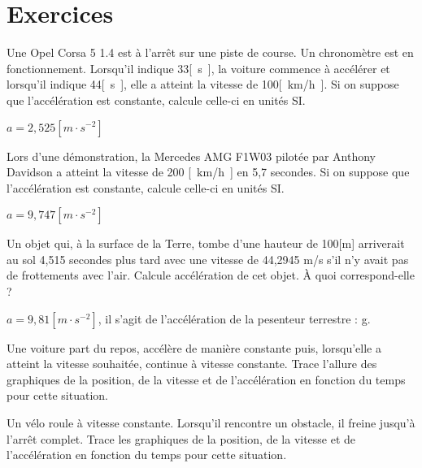 \section{Exercices}
\begin{exercise}
  Une Opel Corsa 5 1.4 est à l'arrêt sur une piste de course. Un chronomètre est en fonctionnement. Lorsqu'il indique 33\unit{[s]}, la voiture commence à accélérer et lorsqu'il indique 44\unit{[s]}, elle a atteint la vitesse de 100\unit{[km/h]}. Si on suppose que l'accélération est constante, calcule celle-ci en unités SI.
\end{exercise}
\begin{solution}
  \(a=2,525\unit{[m \cdot s^{-2}]}\)
\end{solution}
\begin{exercise}
  Lors d'une démonstration, la Mercedes AMG F1W03 pilotée par Anthony Davidson a atteint la vitesse de 200 \unit{[km/h]} en 5,7 secondes. Si on suppose que l'accélération est constante, calcule celle-ci en unités SI.
\end{exercise}
\begin{solution}
  \(a=9,747\unit{[m \cdot s^{-2}]}\)
\end{solution}

\begin{exercise}
  Un objet qui, à la surface de la Terre, tombe d'une hauteur de 100[m] arriverait au sol 4,515 secondes plus tard avec une vitesse de 44,2945 m/s s'il n'y avait pas de frottements avec l'air. Calcule accélération de cet objet. À quoi correspond-elle ?
\end{exercise}
\begin{solution}
  \(a=9,81\unit{[m \cdot s^{-2}]}\), il s'agit de l'accélération de la pesenteur terrestre : g.
\end{solution}

\begin{exercise}
\end{exercise}

\begin{exercise}
  Une voiture part du repos, accélère de manière constante puis, lorsqu'elle a atteint la vitesse souhaitée, continue à vitesse constante.
  Trace l'allure des graphiques de la position, de la vitesse et de l'accélération en fonction du temps pour cette situation.
\end{exercise}

\begin{exercise}
  Un vélo roule à vitesse constante. Lorsqu'il rencontre un obstacle, il freine jusqu'à l'arrêt complet.
  Trace les graphiques de la position, de la vitesse et de l'accélération en fonction du temps pour cette situation.
\end{exercise}

